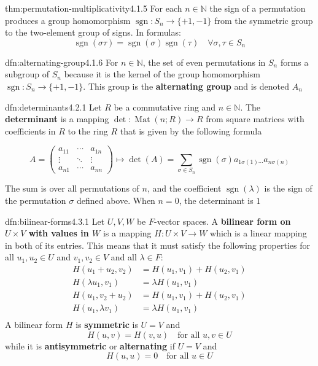 \documentclass[landscape, 8pt]{extarticle}
\DeclareMathOperator{\sgn}{sgn}
\DeclareMathOperator{\Mat}{Mat}
\begin{document}
\begin{multicols}{3}
\newpage
\begin{thm}{thm:permutation-multiplicativity}{4.1.5}
    For each $n\in \mathbb{N}$ the sign of a permutation produces a group homomorphism $\sgn : S_{n} \to \{+1, -1\}$ from the symmetric group to the two-element group of signs. In formulas:
    \[\sgn(\sigma\tau) = \sgn(\sigma)\sgn(\tau) \quad \forall \sigma, \tau\in S_{n}\]
\end{thm}

\begin{dfn}{dfn:alternating-group}{4.1.6}
    For $n\in \mathbb{N}$, the set of even permutations in $S_{n}$ forms a subgroup of $S_{n}$ because it is the kernel of the group homomorphism $\sgn : S_{n}\to \{+1, -1\}$. This group is the \textbf{alternating group} and is denoted $A_{n}$
\end{dfn}

\begin{dfn}{dfn:determinants}{4.2.1}
    Let $R$ be a commutative ring and $n\in \mathbb{N}$. The \textbf{determinant} is a mapping $\det : \Mat(n;R) \to R$ from square matrices with coefficients in $R$ to the ring $R$ that is given by the following formula

    \[A = \begin{pmatrix}
        a_{11} & \cdots & a_{1n}\\
        \vdots & \ddots & \vdots\\
        a_{n1} & \cdots & a_{nn}
    \end{pmatrix} \mapsto \det(A) = \sum_{\sigma\in S_{n}} \sgn(\sigma) a_{1\sigma(1)\cdots}  a_{n\sigma(n)}\]

    The sum is over all permutations of $n$, and the coefficient $\sgn(\lambda)$ is the sign of the permutation $\sigma$ defined above. When $n = 0$, the determinant is $1$
\end{dfn}

\begin{dfn}{dfn:bilinear-forms}{4.3.1}
    Let $U,V,W$ be $F$-vector spaces. A \textbf{bilinear form on $U \times V$ with values in $W$} is a mapping $H: U \times V \to W $ which is a linear mapping in both of its entries. This means that it must satisfy the following properties for all $u_{1}, u_{2}\in U$ and $v_{1}, v_{2}\in V$ and all $\lambda\in F$:
    \begin{align*}
        H(u_{1} + u_{2}, v_{2}) &= H(u_{1}, v_{1}) + H(u_{2}, v_{1})\\
        H(\lambda u_{1}, v_{1}) &= \lambda H(u_{1}, v_{1}) \\
        H(u_{1}, v_{2} + u_{2}) &= H(u_{1}, v_{1}) + H(u_{2}, v_{1})\\
        H(u_{1},\lambda v_{1}) &= \lambda H(u_{1}, v_{1}) \\
    \end{align*}
    A bilinear form $H$ is \textbf{symmetric} is $U = V$ and
    \[H(u,v) = H(v,u)\quad \text{for all } u,v\in U\]
    while it is \textbf{antisymmetric} or \textbf{alternating} if $U = V$ and
    \[H(u, u) = 0 \quad\text{for all } u\in U\]


\end{dfn}
\end{multicols}
\end{document}
